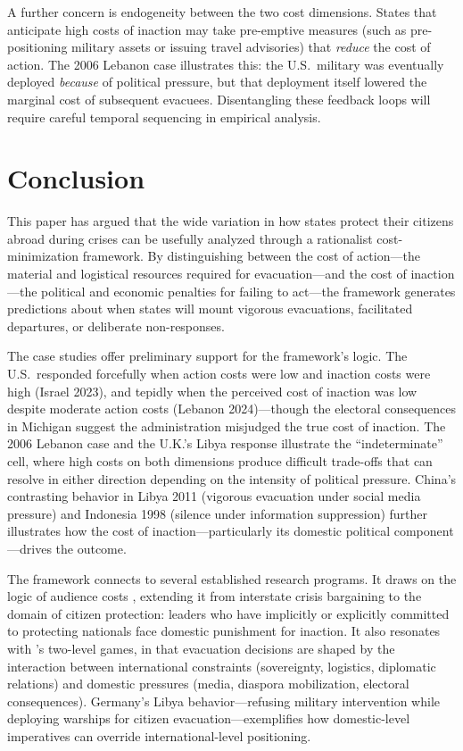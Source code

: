 \documentclass[12pt]{article}
\begin{document}
A further concern is endogeneity between the two cost dimensions. States that anticipate high costs of inaction may take pre-emptive measures (such as pre-positioning military assets or issuing travel advisories) that \emph{reduce} the cost of action. The 2006 Lebanon case illustrates this: the U.S.\ military was eventually deployed \emph{because} of political pressure, but that deployment itself lowered the marginal cost of subsequent evacuees. Disentangling these feedback loops will require careful temporal sequencing in empirical analysis.

\section{Conclusion}

This paper has argued that the wide variation in how states protect their citizens abroad during crises can be usefully analyzed through a rationalist cost-minimization framework. By distinguishing between the cost of action---the material and logistical resources required for evacuation---and the cost of inaction---the political and economic penalties for failing to act---the framework generates predictions about when states will mount vigorous evacuations, facilitated departures, or deliberate non-responses.

The case studies offer preliminary support for the framework's logic. The U.S.\ responded forcefully when action costs were low and inaction costs were high (Israel 2023), and tepidly when the perceived cost of inaction was low despite moderate action costs (Lebanon 2024)---though the electoral consequences in Michigan suggest the administration misjudged the true cost of inaction. The 2006 Lebanon case and the U.K.'s Libya response illustrate the ``indeterminate'' cell, where high costs on both dimensions produce difficult trade-offs that can resolve in either direction depending on the intensity of political pressure. China's contrasting behavior in Libya 2011 (vigorous evacuation under social media pressure) and Indonesia 1998 (silence under information suppression) further illustrates how the cost of inaction---particularly its domestic political component---drives the outcome.

The framework connects to several established research programs. It draws on the logic of audience costs \citep{Fearon1994}, extending it from interstate crisis bargaining to the domain of citizen protection: leaders who have implicitly or explicitly committed to protecting nationals face domestic punishment for inaction. It also resonates with \citet{Putnam1988}'s two-level games, in that evacuation decisions are shaped by the interaction between international constraints (sovereignty, logistics, diplomatic relations) and domestic pressures (media, diaspora mobilization, electoral consequences). Germany's Libya behavior---refusing military intervention while deploying warships for citizen evacuation---exemplifies how domestic-level imperatives can override international-level positioning.
\end{document}
